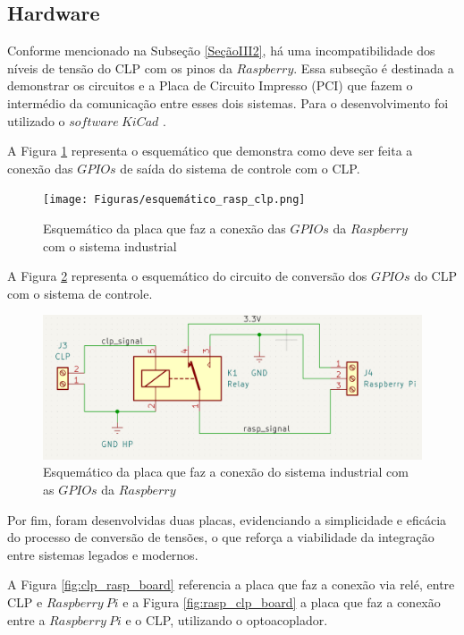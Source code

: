 \documentclass{ecatfg}
\begin{document}
\subsection{Hardware}
Conforme mencionado na Subseção \ref{SeçãoIII2}, há uma incompatibilidade dos níveis de tensão do CLP com os pinos da $Raspberry$. Essa subseção é destinada a demonstrar os circuitos e a Placa de Circuito Impresso (PCI) que fazem o intermédio da comunicação entre esses dois sistemas. Para o desenvolvimento foi utilizado o $software\ KiCad$ \cite{kicad}. \par

A Figura \ref{fig:1} representa o esquemático que demonstra como deve ser feita a conexão das $GPIOs$ de saída do sistema de controle com o CLP.\par

\begin{figure}[!htb]
    \centering
    \texttt{[image: Figuras/esquemático\_rasp\_clp.png]}
    \caption{Esquemático da placa que faz a conexão das $GPIOs$ da $Raspberry$ com o sistema industrial}
    \label{fig:1}
\end{figure}

 A Figura \ref{fig:2} representa o esquemático do circuito de conversão dos $GPIOs$ do CLP com o sistema de controle. \par

\begin{figure}[!htb]
    \centering
    \includegraphics[scale=0.15]{Figuras/esquematico_clp_rasp.png}
    \caption{Esquemático da placa que faz a conexão do sistema industrial com as $GPIOs$ da $Raspberry$}
    \label{fig:2}
\end{figure}

Por fim, foram desenvolvidas duas placas, evidenciando a simplicidade e eficácia do processo de conversão de tensões, o que reforça a viabilidade da integração entre sistemas legados e modernos. \par

A Figura \ref{fig:clp_rasp_board} referencia a placa que faz a conexão via relé, entre CLP e $Raspberry\ Pi$ e a Figura \ref{fig:rasp_clp_board} a placa que faz a conexão entre a $Raspberry\ Pi$ e o CLP, utilizando o optoacoplador. \par
\end{document}
